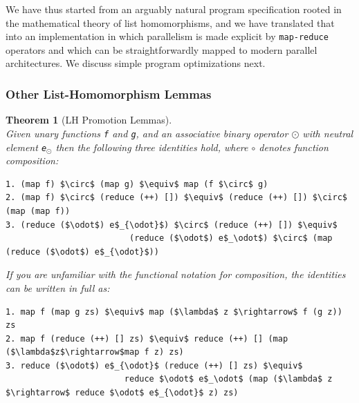 \documentclass[acmsmall,review]{acmart}\settopmatter{printfolios=true,printccs=false,printacmref=false}
\newtheorem{mytheo}{Theorem}
\begin{document}
We have thus started from an arguably natural program specification rooted 
in the mathematical theory of list homomorphisms, and we have translated
that into an implementation in which parallelism is made explicit by
\lstinline{map-reduce} operators and which can be straightforwardly
mapped to modern parallel architectures. We discuss simple program
optimizations next.

\subsubsection{Other List-Homomorphism Lemmas}

\begin{mytheo}[LH Promotion Lemmas]\label{LH-PROMS}
$\mbox{ }$\\
Given unary functions \lstinline{f} and \lstinline{g}, and an 
associative binary operator $\odot$ with neutral element {\tt e$_{\odot}$}
then the following three identities hold, where $\circ$ denotes 
function composition:\\
\begin{lstlisting}[mathescape=true]
1. (map f) $\circ$ (map g) $\equiv$ map (f $\circ$ g)
2. (map f) $\circ$ (reduce (++) []) $\equiv$ (reduce (++) []) $\circ$ (map (map f))
3. (reduce ($\odot$) e$_{\odot}$) $\circ$ (reduce (++) []) $\equiv$
                         (reduce ($\odot$) e$_\odot$) $\circ$ (map (reduce ($\odot$) e$_{\odot}$)) 
\end{lstlisting}
If you are unfamiliar with the functional notation for composition, 
the identities can be written in full as:\\
\begin{lstlisting}[mathescape=true]
1. map f (map g zs) $\equiv$ map ($\lambda$ z $\rightarrow$ f (g z)) zs
2. map f (reduce (++) [] zs) $\equiv$ reduce (++) [] (map ($\lambda$z$\rightarrow$map f z) zs)
3. reduce ($\odot$) e$_{\odot}$ (reduce (++) [] zs) $\equiv$ 
                        reduce $\odot$ e$_\odot$ (map ($\lambda$ z $\rightarrow$ reduce $\odot$ e$_{\odot}$ z) zs) 
\end{lstlisting}\vspace{-2ex}
\end{mytheo}
\end{document}
